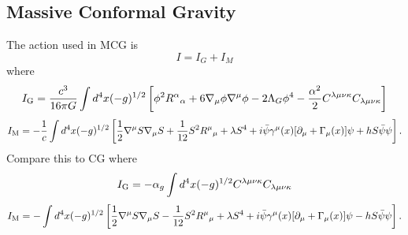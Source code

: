 \documentclass[10pt,letterpaper]{article}
\numberwithin{equation}{subsection}
\begin{document}
\subsection{Massive Conformal Gravity}
The action used in MCG is 
\begin{equation}
I = I_G+I_M
\end{equation}
where
\begin{equation}
I_{\rm G} = \frac{c^3}{16\pi G} \int d^4x(-g)^{1/2} \left[ \phi^2 R^{\alpha}{}_\alpha + 6 \nabla_\mu \phi \nabla^\mu \phi - 2\Lambda_G \phi^4 - \frac{\alpha^2}{2}C^{\lambda\mu\nu\kappa}C_{\lambda\mu\nu\kappa}\right]
\end{equation}
\begin{equation}
I_{\rm M} = -\frac{1}{c}\int d^4x (-g)^{1/2} \left[ \frac12 \nabla^\mu S \nabla_\mu S + \frac{1}{12} S^2 R^{\mu}{}_{\mu} + \lambda S^4 
+ i\bar\psi\gamma^\mu(x)[\partial_\mu + \Gamma_\mu(x)]\psi +hS\bar\psi\psi\right].
\end{equation}
Compare this to CG where
\begin{equation}
I_{\rm G} = -\alpha_g \int d^4x (-g)^{1/2} C^{\lambda\mu\nu\kappa}C_{\lambda\mu\nu\kappa}
\end{equation}
\begin{equation}
	I_{\rm M} = -\int d^4x(-g)^{1/2} \left[ \frac12 \nabla^\mu S \nabla_\mu S - \frac{1}{12} S^2 R^{\mu}{}_{\mu} + \lambda S^4 
+ i\bar\psi\gamma^\mu(x)[\partial_\mu + \Gamma_\mu(x)]\psi -hS\bar\psi\psi\right].
\end{equation}

\end{document}
